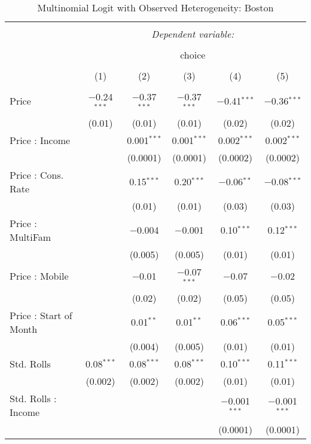 
\begin{table}[!htbp] \centering 
  \caption{Multinomial Logit with Observed Heterogeneity: Boston} 
  \label{tab:mnlBostonObsHet} 
\begin{tabular}{@{\extracolsep{5pt}}lccccc} 
\\[-1.8ex]\hline 
\hline \\[-1.8ex] 
 & \multicolumn{5}{c}{\textit{Dependent variable:}} \\ 
\cline{2-6} 
\\[-1.8ex] & \multicolumn{5}{c}{choice} \\ 
\\[-1.8ex] & (1) & (2) & (3) & (4) & (5)\\ 
\hline \\[-1.8ex] 
 Price & $-$0.24$^{***}$ & $-$0.37$^{***}$ & $-$0.37$^{***}$ & $-$0.41$^{***}$ & $-$0.36$^{***}$ \\ 
  & (0.01) & (0.01) & (0.01) & (0.02) & (0.02) \\ 
  Price : Income &  & 0.001$^{***}$ & 0.001$^{***}$ & 0.002$^{***}$ & 0.002$^{***}$ \\ 
  &  & (0.0001) & (0.0001) & (0.0002) & (0.0002) \\ 
  Price : Cons. Rate &  & 0.15$^{***}$ & 0.20$^{***}$ & $-$0.06$^{**}$ & $-$0.08$^{***}$ \\ 
  &  & (0.01) & (0.01) & (0.03) & (0.03) \\ 
  Price : MultiFam &  & $-$0.004 & $-$0.001 & 0.10$^{***}$ & 0.12$^{***}$ \\ 
  &  & (0.005) & (0.005) & (0.01) & (0.01) \\ 
  Price : Mobile &  & $-$0.01 & $-$0.07$^{***}$ & $-$0.07 & $-$0.02 \\ 
  &  & (0.02) & (0.02) & (0.05) & (0.05) \\ 
  Price : Start of Month &  & 0.01$^{**}$ & 0.01$^{**}$ & 0.06$^{***}$ & 0.05$^{***}$ \\ 
  &  & (0.004) & (0.005) & (0.01) & (0.01) \\ 
  Std. Rolls & 0.08$^{***}$ & 0.08$^{***}$ & 0.08$^{***}$ & 0.10$^{***}$ & 0.11$^{***}$ \\ 
  & (0.002) & (0.002) & (0.002) & (0.01) & (0.01) \\ 
  Std. Rolls : Income &  &  &  & $-$0.001$^{***}$ & $-$0.001$^{***}$ \\ 
  &  &  &  & (0.0001) & (0.0001) \\ 

\end{tabular}
\end{table}
